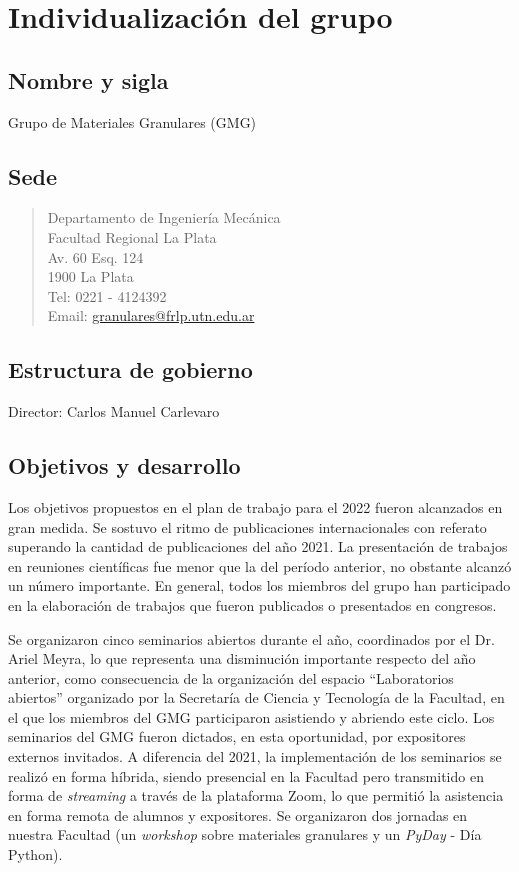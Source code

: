 \documentclass[a4paper,11pt,twoside,final,titlepage,onecolumn,openright]{report}
\begin{document}
\section{Individualización del grupo}

\subsection{Nombre y sigla}
 Grupo de Materiales Granulares (GMG)

 \subsection{Sede}
\begin{quote}
Departamento de Ingeniería Mecánica \\
Facultad Regional La Plata\\
Av. 60 Esq. 124\\
1900 La Plata \\
Tel: 0221 - 4124392\\
Email: \href{mailto://granulares@frlp.utn.edu.ar}{granulares@frlp.utn.edu.ar}
\end{quote}


\subsection{Estructura de gobierno}
Director: Carlos Manuel Carlevaro

\subsection{Objetivos y desarrollo}
Los objetivos propuestos en el plan de trabajo para el 2022 fueron alcanzados en gran medida. Se sostuvo el ritmo de publicaciones internacionales con referato superando la cantidad de publicaciones del año 2021. La presentación de trabajos en reuniones científicas fue menor que la del período anterior, no obstante alcanzó un número importante. En general, todos los miembros del grupo han participado en la elaboración de trabajos que fueron publicados o presentados en congresos.

Se organizaron cinco seminarios abiertos durante el año, coordinados por el Dr. Ariel Meyra, lo que representa una disminución importante respecto del año anterior, como consecuencia de la organización del espacio ``Laboratorios abiertos'' organizado por la Secretaría de Ciencia y Tecnología de la Facultad, en el que los miembros del GMG participaron asistiendo y abriendo este ciclo. Los seminarios del GMG fueron dictados, en esta oportunidad, por expositores externos invitados. A diferencia del 2021, la implementación de los seminarios se realizó en forma híbrida, siendo presencial en la Facultad pero transmitido en forma de \textit{streaming} a través de la plataforma Zoom, lo que permitió la asistencia en forma remota de alumnos y expositores. Se organizaron dos jornadas en nuestra Facultad (un \textit{workshop} sobre materiales granulares y un \textit{PyDay} - Día Python). 
\end{document}
